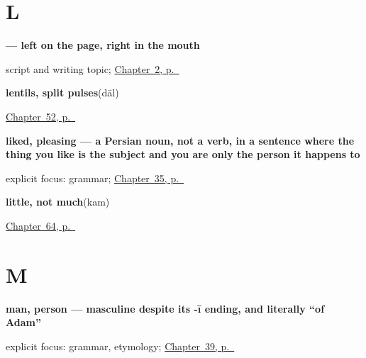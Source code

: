 \section*{L}

\noindent\begin{minipage}[t]{\linewidth}
\raggedright
\textbf{ — left on the page, right in the mouth}\par
\footnotesize script and writing topic; \hyperref[ch:introductions]{Chapter~2, p.~\pageref*{ch:introductions}}
\end{minipage}\par\smallskip

\noindent\begin{minipage}[t]{\linewidth}
\raggedright
\textbf{lentils, split pulses}\enspace\emph{}\enspace(dāl)\par
\footnotesize \hyperref[ch:hi-in-the-kitchen]{Chapter~52, p.~\pageref*{ch:hi-in-the-kitchen}}
\end{minipage}\par\smallskip

\noindent\begin{minipage}[t]{\linewidth}
\raggedright
\textbf{liked, pleasing — a Persian noun, not a verb, in a sentence where the thing you like is the subject and you are only the person it happens to}\enspace\emph{}\par
\footnotesize explicit focus: grammar; \hyperref[ch:hi-pasand]{Chapter~35, p.~\pageref*{ch:hi-pasand}}
\end{minipage}\par\smallskip

\noindent\begin{minipage}[t]{\linewidth}
\raggedright
\textbf{little, not much}\enspace\emph{}\enspace(kam)\par
\footnotesize \hyperref[ch:hi-how-much-and-how-fast]{Chapter~64, p.~\pageref*{ch:hi-how-much-and-how-fast}}
\end{minipage}\par\smallskip

\section*{M}

\noindent\begin{minipage}[t]{\linewidth}
\raggedright
\textbf{man, person — masculine despite its -ī ending, and literally \textquotedblleft{}of Adam\textquotedblright{}}\enspace\emph{}\par
\footnotesize explicit focus: grammar, etymology; \hyperref[ch:hi-people-around-you]{Chapter~39, p.~\pageref*{ch:hi-people-around-you}}
\end{minipage}\par\smallskip

